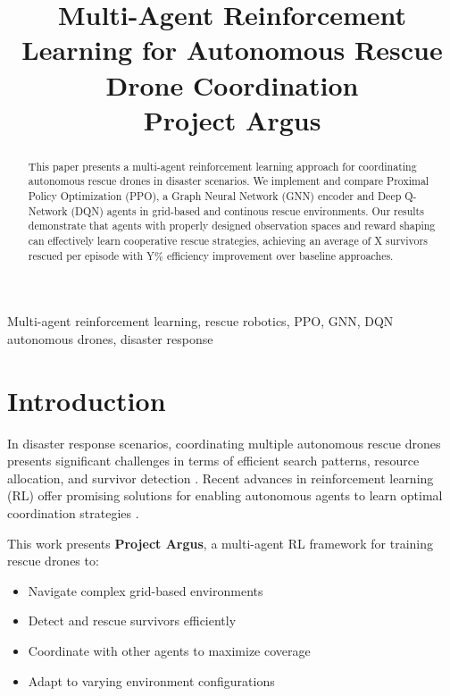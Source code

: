 \documentclass[conference]{IEEEtran}
\begin{document}
\title{Multi-Agent Reinforcement Learning for Autonomous Rescue Drone Coordination\\
{\footnotesize Project Argus}
}

\author{
}

\maketitle

\begin{abstract}
This paper presents a multi-agent reinforcement learning approach for coordinating autonomous rescue drones in disaster scenarios. We implement and compare Proximal Policy Optimization (PPO), a Graph Neural Network (GNN) encoder and Deep Q-Network (DQN) agents in grid-based and continous rescue environments. Our results demonstrate that agents with properly designed observation spaces and reward shaping can effectively learn cooperative rescue strategies, achieving an average of X survivors rescued per episode with Y\% efficiency improvement over baseline approaches.
\end{abstract}

\begin{IEEEkeywords}
Multi-agent reinforcement learning, rescue robotics, PPO, GNN, DQN autonomous drones, disaster response
\end{IEEEkeywords}

\section{Introduction}
In disaster response scenarios, coordinating multiple autonomous rescue drones presents significant challenges in terms of efficient search patterns, resource allocation, and survivor detection \cite{placeholder1}. Recent advances in reinforcement learning (RL) offer promising solutions for enabling autonomous agents to learn optimal coordination strategies \cite{placeholder2}.

This work presents \textbf{Project Argus}, a multi-agent RL framework for training rescue drones to:
\begin{itemize}
    \item Navigate complex grid-based environments
    \item Detect and rescue survivors efficiently
    \item Coordinate with other agents to maximize coverage
    \item Adapt to varying environment configurations
\end{itemize}
\end{document}
